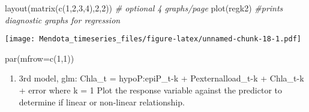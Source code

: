 \documentclass[
]{article}
\newenvironment{Shaded}{\begin{snugshade}}{\end{snugshade}}
\newcommand{\AttributeTok}[1]{\textcolor[rgb]{0.77,0.63,0.00}{#1}}
\newcommand{\CommentTok}[1]{\textcolor[rgb]{0.56,0.35,0.01}{\textit{#1}}}
\newcommand{\DecValTok}[1]{\textcolor[rgb]{0.00,0.00,0.81}{#1}}
\newcommand{\FloatTok}[1]{\textcolor[rgb]{0.00,0.00,0.81}{#1}}
\newcommand{\FunctionTok}[1]{\textcolor[rgb]{0.00,0.00,0.00}{#1}}
\newcommand{\NormalTok}[1]{#1}
\newcommand{\OtherTok}[1]{\textcolor[rgb]{0.56,0.35,0.01}{#1}}
\newcommand{\SpecialCharTok}[1]{\textcolor[rgb]{0.00,0.00,0.00}{#1}}
\providecommand{\tightlist}{%
  \setlength{\itemsep}{0pt}\setlength{\parskip}{0pt}}
\begin{document}
\begin{Shaded}
\begin{Highlighting}[]
\FunctionTok{layout}\NormalTok{(}\FunctionTok{matrix}\NormalTok{(}\FunctionTok{c}\NormalTok{(}\DecValTok{1}\NormalTok{,}\DecValTok{2}\NormalTok{,}\DecValTok{3}\NormalTok{,}\DecValTok{4}\NormalTok{),}\DecValTok{2}\NormalTok{,}\DecValTok{2}\NormalTok{)) }\CommentTok{\# optional 4 graphs/page}
\FunctionTok{plot}\NormalTok{(regk2) }\CommentTok{\#prints diagnostic graphs for regression}
\end{Highlighting}
\end{Shaded}

\texttt{[image: Mendota\_timeseries\_files/figure-latex/unnamed-chunk-18-1.pdf]}

\begin{Shaded}
\begin{Highlighting}[]
\FunctionTok{par}\NormalTok{(}\AttributeTok{mfrow=}\FunctionTok{c}\NormalTok{(}\DecValTok{1}\NormalTok{,}\DecValTok{1}\NormalTok{))}
\end{Highlighting}
\end{Shaded}

\begin{enumerate}
\def\labelenumi{\alph{enumi})}
\setcounter{enumi}{2}
\tightlist
\item
  3rd model, glm: Chla\_t = hypoP:epiP\_t-k + Pexternalload\_t-k +
  Chla\_t-k + error where k = 1 Plot the response variable against the
  predictor to determine if linear or non-linear relationship.
\end{enumerate}

\begin{Shaded}
\end{Shaded}
\end{document}
